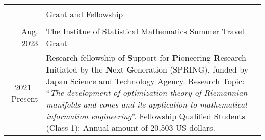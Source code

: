 \documentclass[a4paper,11pt]{article}
\newcommand{\headingfont}{\LARGE \MakeUppercase }
\newenvironment{SectionTable}[1]{
	\renewcommand*{\arraystretch}{1.0}
	\setlength{\tabcolsep}{10pt}
	\begin{longtable}{Rp{5.2in}} 
		\rule{2.3cm}{4pt} 
		& \underline{#1} \\ %
	}
	{
	\end{longtable}\vspace{-.3cm}
}
\begin{document}
\begin{SectionTable}{\headingfont Grant and Fellowship}
	Aug. 2023 & The Institue of Statistical Mathematics Summer Travel Grant \\
	
	2021 -- Present &
	Research fellowship of 
	{\textbf{S}upport for \textbf{P}ioneering \textbf{R}esearch \textbf{I}nitiated by the \textbf{N}ext \textbf{G}eneration} (SPRING), funded by Japan Science and Technology Agency. \newline
	Research Topic: ``\textit{The development of optimization theory of Riemannian manifolds and cones and its application to mathematical information engineering}''. \newline
	Fellowship Qualified Students (Class 1):
	Annual amount of 20,503 US dollars.
\end{SectionTable}

\end{document}

